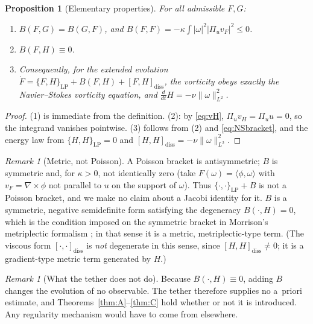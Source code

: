 \documentclass[11pt,reqno]{amsart}
\newtheorem{proposition}[lemma]{Proposition}
\theoremstyle{definition}
\theoremstyle{remark}
\newtheorem{remark}[lemma]{Remark}
\newcommand{\norm}[1]{\lVert #1\rVert}
\newcommand{\abs}[1]{\lvert #1\rvert}
\newcommand{\ip}[2]{\langle #1,#2\rangle}
\newcommand{\curl}{\nabla\times}
\newcommand{\Pu}{\Pi_u}
\begin{document}
\begin{proposition}[Elementary properties]\label{prop:tether}
For all admissible $F,G$:
\begin{enumerate}
\item $B(F,G)=B(G,F)$, and $B(F,F)=-\kappa\int\abs{\omega}^2\abs{\Pu v_F}^2\le0$.
\item $B(F,H)\equiv0$.
\item Consequently, for the extended evolution $\dot F=\{F,H\}_{\mathrm{LP}}+B(F,H)+[F,H]_{\mathrm{diss}}$, the vorticity obeys exactly the Navier--Stokes vorticity equation, and $\frac{d}{dt}H=-\nu\norm{\omega}_{L^2}^2$.
\end{enumerate}
\end{proposition}

\begin{proof}
(1) is immediate from the definition. (2): by \eqref{eq:vH}, $\Pu v_H=\Pu u=0$, so the integrand vanishes pointwise. (3) follows from (2) and \eqref{eq:NSbracket}, and the energy law from $\{H,H\}_{\mathrm{LP}}=0$ and $[H,H]_{\mathrm{diss}}=-\nu\norm{\omega}_{L^2}^2$.
\end{proof}

\begin{remark}[Metric, not Poisson]\label{rem:metric}
A Poisson bracket is antisymmetric; $B$ is symmetric and, for $\kappa>0$, not identically zero (take $F(\omega)=\ip{\phi}{\omega}$ with $v_F=\curl\phi$ not parallel to $u$ on the support of $\omega$). Thus $\{\cdot,\cdot\}_{\mathrm{LP}}+B$ is not a Poisson bracket, and we make no claim about a Jacobi identity for it. $B$ is a symmetric, negative semidefinite form satisfying the degeneracy $B(\cdot,H)=0$, which is the condition imposed on the symmetric bracket in Morrison's metriplectic formalism \cite{Morrison1986}; in that sense it is a metric, metriplectic-type term. (The viscous form $[\cdot,\cdot]_{\mathrm{diss}}$ is \emph{not} degenerate in this sense, since $[H,H]_{\mathrm{diss}}\neq0$; it is a gradient-type metric term generated by $H$.)
\end{remark}

\begin{remark}[What the tether does not do]\label{rem:nothing}
Because $B(\cdot,H)\equiv0$, adding $B$ changes the evolution of no observable. The tether therefore supplies no a~priori estimate, and Theorems~\ref{thm:A}--\ref{thm:C} hold whether or not it is introduced. Any regularity mechanism would have to come from elsewhere.
\end{remark}
\end{document}

